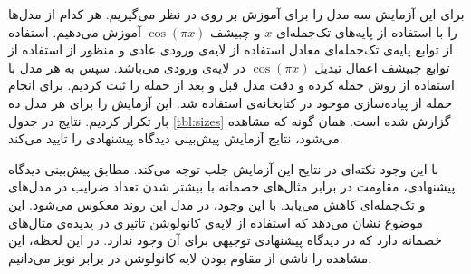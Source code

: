 \documentclass[12pt,onecolumn,a4paper]{article}
\begin{document}
برای این آزمایش سه مدل را برای آموزش بر روی
در نظر می‌گیریم. هر کدام از مدل‌ها را با استفاده از پایه‌های تک‌جمله‌ای $x$ و چبیشف $\cos(\pi x)$ آموزش می‌دهیم. استفاده از توابع پایه‌ی تک‌جمله‌ای معادل استفاده از لایه‌ی ورودی عادی و منظور از استفاده از توابع چبیشف اعمال تبدیل $\cos(\pi x)$ در لایه‌ی ورودی می‌باشد. سپس به هر مدل با استفاده از روش
حمله کرده و  دقت مدل قبل و بعد از حمله را ثبت کردیم. برای انجام حمله از پیاده‌سازی موجود در کتابخانه‌ی  استفاده شد. این آزمایش را برای هر مدل ده بار تکرار کردیم. نتایج در جدول
\ref{tbl:sizes}
گزارش شده است. همان گونه که مشاهده می‌شود، نتایج آزمایش پیش‌بینی دیدگاه پیشنهادی را تایید می‌کند.

\begin{table}[]
    \begin{latin}
    \end{latin}
    \caption{مدل‌های استفاده شده در آزمایش، ابعاد آنها و دقت آنها قبل و پس از حمله‌ی . همان طور که مشاهده می‌شود، استفاده از توابع پایه‌ی چبیشف به صورت معنی داری باعث بهبود مقاومت در برابر حمله می‌شود.}
    \label{tbl:sizes}
\end{table}
با این وجود نکته‌ای در نتایج این آزمایش جلب توجه می‌کند. مطابق پیش‌بینی دیدگاه پیشنهادی، مقاومت در برابر مثال‌های خصمانه با بیشتر شدن تعداد ضرایب در مدل‌های  و  تک‌جمله‌ای کاهش می‌یابد. با این وجود، در مدل  این روند معکوس می‌شود. این موضوع نشان می‌دهد که استفاده از لایه‌ی کانولوشن تاثیری در پدیده‌ی مثال‌های خصمانه دارد که در دیدگاه پیشنهادی توجیهی برای آن وجود ندارد. در این لحظه، این مشاهده را ناشی از مقاوم بودن لایه کانولوشن در برابر نویز می‌دانیم.
\end{document}
